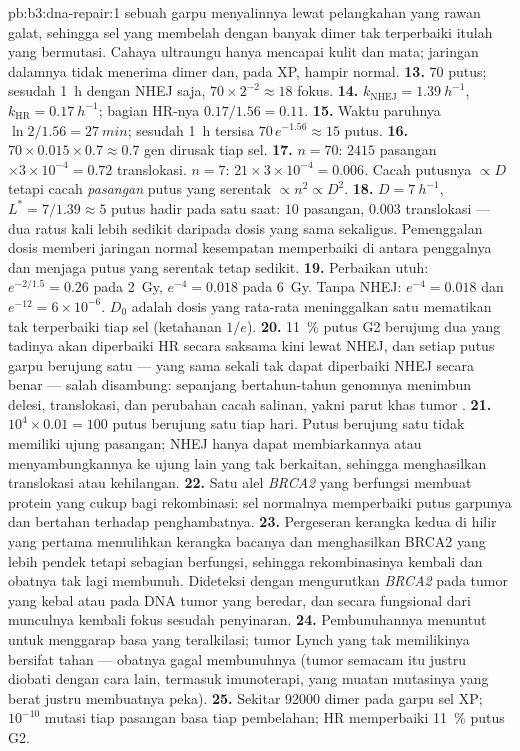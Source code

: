 \begin{solution}{pb:b3:dna-repair:1}
sebuah garpu menyalinnya lewat pelangkahan yang rawan galat, sehingga sel
yang membelah dengan banyak dimer tak terperbaiki itulah yang bermutasi.
Cahaya ultraungu hanya mencapai kulit dan mata; jaringan dalamnya tidak
menerima dimer dan, pada XP, hampir normal.
\textbf{13.} $70$ putus; sesudah \qty{1}{h} dengan NHEJ saja, $70\times
2^{-2} \approx 18$ fokus.
\textbf{14.} $k_{\text{NHEJ}} = \qty{1.39}{h^{-1}}$, $k_{\text{HR}} =
\qty{0.17}{h^{-1}}$; bagian HR-nya $0.17/1.56 = 0.11$.
\textbf{15.} Waktu paruhnya $\ln 2/1.56 = \qty{27}{min}$; sesudah \qty{1}{h}
tersisa $70\,e^{-1.56} \approx 15$ putus.
\textbf{16.} $70\times 0.015\times 0.7 \approx 0.7$ gen dirusak tiap
sel.
\textbf{17.} $n = 70$: $2415$ pasangan $\times 3\times 10^{-4} = 0.72$
translokasi. $n = 7$: $21\times 3\times 10^{-4} = 0.006$. Cacah putusnya
$\propto D$ tetapi cacah \emph{pasangan} putus yang serentak
$\propto n^{2} \propto D^{2}$.
\textbf{18.} $D = \qty{7}{h^{-1}}$, $L^{*} = 7/1.39 \approx 5$ putus
hadir pada satu saat: $10$ pasangan, $0.003$ translokasi --- dua ratus
kali lebih sedikit daripada dosis yang sama sekaligus. Pemenggalan dosis
memberi jaringan normal kesempatan memperbaiki di antara penggalnya dan
menjaga putus yang serentak tetap sedikit.
\textbf{19.} Perbaikan utuh: $e^{-2/1.5} = 0.26$ pada \qty{2}{Gy},
$e^{-4} = 0.018$ pada \qty{6}{Gy}. Tanpa NHEJ: $e^{-4} = 0.018$ dan
$e^{-12} = 6\times 10^{-6}$. $D_{0}$ adalah dosis yang rata-rata
meninggalkan satu  mematikan tak terperbaiki tiap sel (ketahanan $1/e$).
\textbf{20.} \qty{11}{\%} putus G2 berujung dua yang tadinya akan
diperbaiki HR secara saksama kini lewat NHEJ, dan setiap putus garpu
berujung satu --- yang sama sekali tak dapat diperbaiki NHEJ secara benar ---
salah disambung: sepanjang bertahun-tahun genomnya menimbun delesi,
translokasi, dan perubahan cacah salinan, yakni parut khas tumor \emph{}.
\textbf{21.} $10^{4}\times 0.01 = 100$ putus berujung satu tiap hari.
Putus berujung satu tidak memiliki ujung pasangan; NHEJ hanya dapat
membiarkannya atau menyambungkannya ke ujung lain yang tak berkaitan,
sehingga menghasilkan translokasi atau kehilangan.
\textbf{22.} Satu alel \emph{BRCA2} yang berfungsi membuat protein yang cukup
bagi rekombinasi: sel normalnya memperbaiki putus garpunya dan bertahan
terhadap penghambatnya.
\textbf{23.} Pergeseran kerangka kedua di hilir yang pertama memulihkan
kerangka bacanya dan menghasilkan BRCA2 yang lebih pendek tetapi sebagian
berfungsi, sehingga rekombinasinya kembali dan obatnya tak lagi membunuh.
Dideteksi dengan mengurutkan \emph{BRCA2} pada tumor yang kebal atau pada DNA
tumor yang beredar, dan secara fungsional dari munculnya kembali fokus 
sesudah penyinaran.
\textbf{24.} Pembunuhannya menuntut  untuk menggarap
basa yang teralkilasi; tumor Lynch yang tak memilikinya bersifat tahan ---
obatnya gagal membunuhnya (tumor semacam itu justru diobati dengan cara lain,
termasuk imunoterapi, yang muatan mutasinya yang berat justru membuatnya
peka).
\textbf{25.} Sekitar \num{92000} dimer pada garpu sel XP;
$10^{-10}$ mutasi tiap pasangan basa tiap pembelahan; HR memperbaiki
\qty{11}{\%} putus G2.
\end{solution}
